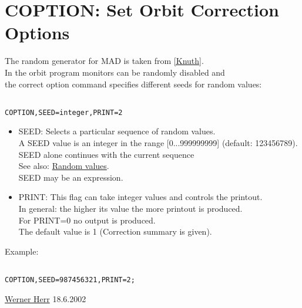 



\section{COPTION: Set Orbit Correction Options}  The random generator for MAD is taken from \href{../Introduction/bibliography.html#knuth}{[Knuth]}. 
\\ In the orbit program monitors can be randomly disabled and 
\\ the correct option command specifies different seeds for random values: 
\begin{verbatim}

COPTION,SEED=integer,PRINT=2      
\end{verbatim}
\begin{itemize}
	\item SEED: Selects a particular sequence of random values. 
\\ A SEED value is an integer in the range [0...999999999] (default: 123456789). 
\\ SEED alone continues with the current sequence 
\\ See also: \href{../Introduction/expression.html#random}{Random values}. 
\\ SEED may be an expression. 
	\item PRINT: This flag can take integer values and controls the printout. 
\\ In general: the higher its value the more printout is produced.  
\\ For PRINT=0 no output is produced. 
\\ The default value is 1 (Correction summary is given). 
\end{itemize} Example: 
\begin{verbatim}

COPTION,SEED=987456321,PRINT=2;
\end{verbatim}\href{http://consult.cern.ch/xwho/people/1808}{Werner Herr} 18.6.2002 

